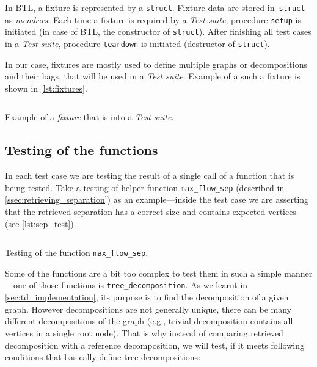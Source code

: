 \documentclass[thesis=B,english]{FITthesis}[2019/03/21]
\begin{document}
In BTL, a fixture is represented by a \texttt{struct}. Fixture data are stored in~\texttt{struct} as \emph{members}. Each time a fixture is required by a \emph{Test suite}, procedure \texttt{setup} is initiated (in case of BTL, the constructor of \texttt{struct}). After finishing all test cases in a \emph{Test suite}, procedure \texttt{teardown} is initiated (destructor of \texttt{struct}).

In our case, fixtures are mostly used to define multiple graphs or decompositions and their bags, that will be used in a \emph{Test suite}. Example of a such a fixture is shown in \autoref{lst:fixtures}.

\begin{listing}[H]
	\inputminted[tabsize=2,breaklines,bgcolor=codebg]{c++}{snippets/fixtures.m}
	\caption[Example of a \emph{fixture} that is  into a \emph{Test suite}]{Example of a \emph{fixture} that is  into a \emph{Test suite}.}
	\label{lst:fixtures}
\end{listing}

\subsection{Testing of the functions}
In each test case we are testing the result of a single call of a function that is being tested. Take a testing of helper function \texttt{max\_flow\_sep} (described in \autoref{ssec:retrieving_separation}) as an example---inside the test case we are asserting that the retrieved separation has a correct size and contains expected vertices (see \autoref{lst:sep_test}).

\begin{listing}[H]
	\inputminted[tabsize=2,breaklines,bgcolor=codebg]{c++}{snippets/sep_test.m}
	\caption[Testing of the function \texttt{max\_flow\_sep}]{Testing of the function \texttt{max\_flow\_sep}.}
	\label{lst:sep_test}
\end{listing}

Some of the functions are a bit too complex to test them in such a simple manner---one of those functions is \texttt{tree\_decomposition}. As we learnt in \autoref{sec:td_implementation}, its purpose is to find the decomposition of a given graph. However decompositions are not generally unique, there can be many different decompositions of the graph (e.g., trivial decomposition contains all vertices in a single root node). That is why instead of comparing retrieved decomposition with a reference decomposition, we will test, if it meets following conditions that basically define tree decompositions:
\end{document}
